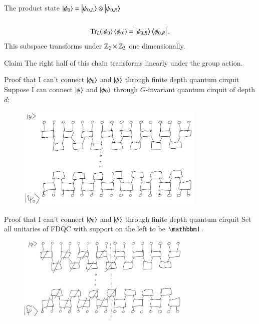 \documentclass{beamer}
\begin{document}
\begin{frame}{The product state}
	$\ket{\phi_0}=\ket{\psi_{0,L}}\otimes\ket{\psi_{0,R}}$ \\
	\\
	\pause
	\begin{equation*}
		\textrm{Tr}_L(\ket{\phi_0}\bra{\phi_0})=\ket{\phi_{0,R}}\bra{\phi_{0,R}}.
	\end{equation*}
	\pause
	This subspace transforms under $\mathbb{Z}_2\times\mathbb{Z}_2$ one dimensionally.
	\begin{block}{Claim}
		The right half of this chain transforms linearly under the group action.
	\end{block}
\end{frame}

\begin{frame}{Proof that I can't connect $\ket{\phi_0}$ and $\ket{\psi}$ through finite depth quantum cirquit}
	Suppose I can connect $\ket{\psi}$ and $\ket{\phi_0}$ through $G$-invariant quantum cirquit of depth $d$:
	\begin{figure}
		\center
		\includegraphics[width=0.8\textwidth]{Figures/ConnectingPsiAndPsi0Proof.png}
	\end{figure}
\end{frame}

\begin{frame}{Proof that I can't connect $\ket{\phi_0}$ and $\ket{\psi}$ through finite depth quantum cirquit}
	Set all unitaries of FDQC with support on the left to be $\id$.
	\begin{figure}
		\center
		\includegraphics[width=0.75\textwidth]{Figures/ConnectingPsiAndPsi0Proof2.png}
	\end{figure}
\end{frame}
\end{document}
